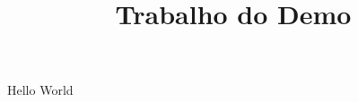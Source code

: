 \documentclass[artigo, 12pt]{artigo}
\title{Trabalho do Demo}
\begin{document}
    Hello World
\end{document}
